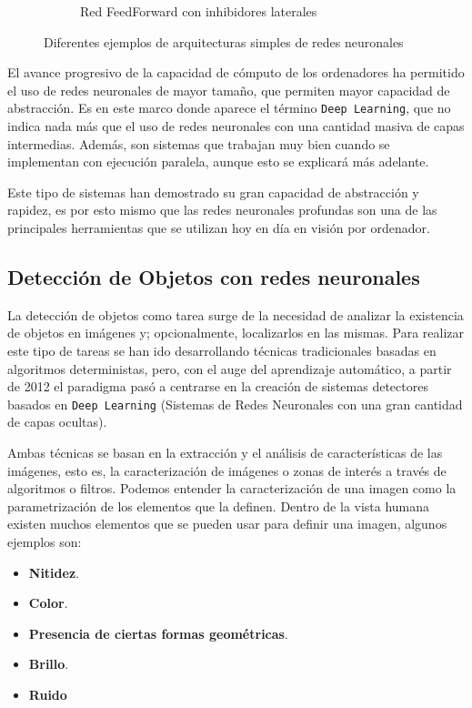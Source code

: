 \begin{figure}[H]
\begin{subfigure}[b]{0.45\textwidth}
        \caption{Red FeedForward con inhibidores laterales}
        \label{fig:c}
    \end{subfigure}
    \caption{Diferentes ejemplos de arquitecturas simples de redes neuronales\cite{duNeuralNetworksStatistical2013}}
    \label{fig:ArquitecturasRedes}
\end{figure}

El avance progresivo de la capacidad de cómputo de los ordenadores ha permitido el uso de redes neuronales de mayor tamaño, que permiten mayor capacidad de abstracción. Es en este marco donde aparece el término 
\texttt{Deep Learning}, que no indica nada más que el uso de redes neuronales con una cantidad masiva de capas intermedias. Además, son sistemas que trabajan muy bien cuando se implementan con ejecución paralela, 
aunque esto se explicará más adelante.

Este tipo de sistemas han demostrado su gran capacidad de abstracción y rapidez, es por esto mismo que las redes neuronales profundas son una de las principales herramientas que se utilizan hoy en día en 
visión por ordenador.

\clearpage
\subsection{Detección de Objetos con redes neuronales}

La detección de objetos como tarea surge de la necesidad de analizar la existencia de objetos en imágenes y; opcionalmente, localizarlos en las mismas. Para realizar este tipo de tareas se han ido 
desarrollando técnicas tradicionales basadas en algoritmos deterministas, pero, con el auge del aprendizaje automático, a partir de 2012\cite{zouObjectDetection202023} 
el paradigma pasó a centrarse en la creación de sistemas detectores basados en \texttt{Deep Learning} (Sistemas de Redes Neuronales con una gran cantidad de capas ocultas).

Ambas técnicas se basan en la extracción y el análisis de características de las imágenes, esto es, la caracterización de imágenes o zonas de interés a través de algoritmos o filtros. Podemos entender la caracterización 
de una imagen como la parametrización de los elementos que la definen. Dentro de la vista humana existen muchos elementos que se pueden usar para definir una imagen, algunos ejemplos son:
\begin{itemize}
    \item \textbf{Nitidez}.
    \item \textbf{Color}.
    \item \textbf{Presencia de ciertas formas geométricas}.
    \item \textbf{Brillo}.
    \item \textbf{Ruido}
\end{itemize}


